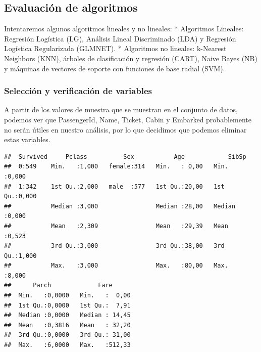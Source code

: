 \documentclass[]{article}
\newenvironment{Shaded}{\begin{snugshade}}{\end{snugshade}}
\newcommand{\KeywordTok}[1]{\textcolor[rgb]{0.13,0.29,0.53}{\textbf{#1}}}
\newcommand{\DecValTok}[1]{\textcolor[rgb]{0.00,0.00,0.81}{#1}}
\newcommand{\StringTok}[1]{\textcolor[rgb]{0.31,0.60,0.02}{#1}}
\newcommand{\CommentTok}[1]{\textcolor[rgb]{0.56,0.35,0.01}{\textit{#1}}}
\newcommand{\OperatorTok}[1]{\textcolor[rgb]{0.81,0.36,0.00}{\textbf{#1}}}
\newcommand{\NormalTok}[1]{#1}
\begin{document}
\subsection{Evaluación de algoritmos}\label{evaluacion-de-algoritmos}

Intentaremos algunos algoritmos lineales y no lineales: * Algoritmos
Lineales: Regresión Logística (LG), Análisis Lineal Discriminado (LDA) y
Regresión Logística Regularizada (GLMNET). * Algoritmos no lineales:
k-Nearest Neighbors (KNN), árboles de clasificación y regresión (CART),
Naive Bayes (NB) y máquinas de vectores de soporte con funciones de base
radial (SVM).

\subsubsection{Selección y verificación de
variables}\label{seleccion-y-verificacion-de-variables}

A partir de los valores de muestra que se muestran en el conjunto de
datos, podemos ver que PassengerId, Name, Ticket, Cabin y Embarked
probablemente no serán útiles en nuestro análisis, por lo que decidimos
que podemos eliminar estas variables.

\begin{Shaded}
\end{Shaded}

\begin{verbatim}
##  Survived     Pclass          Sex           Age            SibSp      
##  0:549    Min.   :1,000   female:314   Min.   : 0,00   Min.   :0,000  
##  1:342    1st Qu.:2,000   male  :577   1st Qu.:20,00   1st Qu.:0,000  
##           Median :3,000                Median :28,00   Median :0,000  
##           Mean   :2,309                Mean   :29,39   Mean   :0,523  
##           3rd Qu.:3,000                3rd Qu.:38,00   3rd Qu.:1,000  
##           Max.   :3,000                Max.   :80,00   Max.   :8,000  
##      Parch             Fare       
##  Min.   :0,0000   Min.   :  0,00  
##  1st Qu.:0,0000   1st Qu.:  7,91  
##  Median :0,0000   Median : 14,45  
##  Mean   :0,3816   Mean   : 32,20  
##  3rd Qu.:0,0000   3rd Qu.: 31,00  
##  Max.   :6,0000   Max.   :512,33
\end{verbatim}
\end{document}
